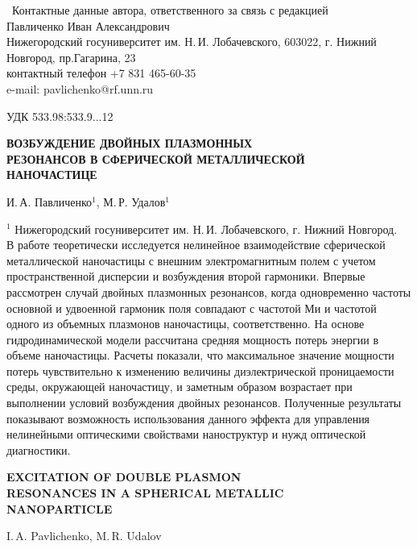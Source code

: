 \documentclass[12pt, a4paper]{article}
\begin{document}
\thispagestyle{empty}

 \ Контактные данные автора, ответственного за связь с редакцией\\
Павличенко Иван Александрович\\
Нижегородский госуниверситет им. Н.\,И. Лобачевского, 603022, г. Нижний Новгород, пр.Гагарина, 23\\
контактный телефон {+7 831 465-60-35}\\
e-mail: pavlichenko@rf.unn.ru 

\newpage
\setcounter{page}{1}

УДК 533.98{:}533.9...12
\begin{center}
\large\bf ВОЗБУЖДЕНИЕ ДВОЙНЫХ ПЛАЗМОННЫХ\\ РЕЗОНАНСОВ В СФЕРИЧЕСКОЙ МЕТАЛЛИЧЕСКОЙ\\НАНОЧАСТИЦЕ
\end{center}

И.\,А. Павличенко$^{1}$, М.\,Р. Удалов$^{1}$

$^1$ Нижегородский госуниверситет им. Н.\,И. Лобачевского, г. Нижний Новгород.\\

В работе теоретически исследуется нелинейное взаимодействие сферической металлической наночастицы с внешним электромагнитным полем с учетом пространственной дисперсии и возбуждения второй гармоники.
Впервые рассмотрен случай двойных плазмонных резонансов, когда одновременно частоты основной и удвоенной гармоник поля совпадают с частотой Ми и частотой одного из объемных плазмонов наночастицы, соответственно.
На основе гидродинамической модели рассчитана средняя мощность потерь энергии в объеме наночастицы.
Расчеты показали, что максимальное значение мощности потерь 
чувствительно к изменению величины диэлектрической проницаемости среды, окружающей наночастицу, и заметным образом возрастает при выполнении условий возбуждения двойных резонансов.
Полученные результаты показывают возможность использования данного эффекта для управления нелинейными оптическими свойствами наноструктур и нужд оптической диагностики.


\newpage
\begin{center}
{\large\bf EXCITATION OF DOUBLE PLASMON\\ RESONANCES IN A SPHERICAL METALLIC\\ NANOPARTICLE}
\end{center}

I.\,A. Pavlichenko, M.\,R. Udalov
\end{document}
